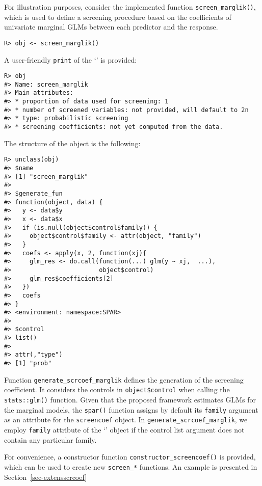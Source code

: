 \documentclass[
  article]{jss}
\newcommand{\class}[1]{`\code{#1}'}
\begin{document}
For illustration purposes, consider the implemented function
\texttt{screen\_marglik()}, which is used to define a screening
procedure based on the coefficients of univariate marginal GLMs between
each predictor and the response.

\begin{verbatim}
R> obj <- screen_marglik()
\end{verbatim}

A user-friendly \texttt{print} of the \class{screencoef} is provided:

\begin{verbatim}
R> obj
#> Name: screen_marglik 
#> Main attributes: 
#> * proportion of data used for screening: 1 
#> * number of screened variables: not provided, will default to 2n 
#> * type: probabilistic screening 
#> * screening coefficients: not yet computed from the data.
\end{verbatim}

The structure of the object is the following:

\begin{verbatim}
R> unclass(obj)
#> $name
#> [1] "screen_marglik"
#> 
#> $generate_fun
#> function(object, data) {
#>   y <- data$y
#>   x <- data$x
#>   if (is.null(object$control$family)) {
#>     object$control$family <- attr(object, "family")
#>   }
#>   coefs <- apply(x, 2, function(xj){
#>     glm_res <- do.call(function(...) glm(y ~ xj,  ...),
#>                        object$control)
#>     glm_res$coefficients[2]
#>   })
#>   coefs
#> }
#> <environment: namespace:SPAR>
#> 
#> $control
#> list()
#> 
#> attr(,"type")
#> [1] "prob"
\end{verbatim}

Function \texttt{generate\_scrcoef\_marglik} defines the generation of
the screening coefficient. It considers the controls in
\texttt{object\$control} when calling the \texttt{stats::glm()}
function. Given that the proposed framework estimates GLMs for the
marginal models, the \texttt{spar()} function assigns by default its
\texttt{family} argument as an attribute for the \texttt{screencoef}
object. In \texttt{generate\_scrcoef\_marglik}, we employ
\texttt{family} attribute of the \class{screencoef} object if the
control list argument does not contain any particular family.

For convenience, a constructor function
\texttt{constructor\_screencoef()} is provided, which can be used to
create new \texttt{screen\_*} functions. An example is presented in
Section~\ref{sec-extensscrcoef}
\end{document}
